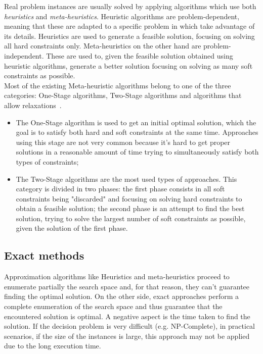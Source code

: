 Real problem instances are usually solved by applying algorithms which use both \textit{heuristics} and \textit{meta-heuristics}. Heuristic algorithms are problem-dependent, meaning that these are adapted to a specific problem in which take advantage of its details. Heuristics are used to generate a feasible solution, focusing on solving all hard constraints only. Meta-heuristics on the other hand are problem-independent. These are used to, given the feasible solution obtained using heuristic algorithms, generate a better solution focusing on solving as many soft constraints as possible.\\

Most of the existing Meta-heuristic algorithms belong to one of the three categories: One-Stage algorithms, Two-Stage algorithms and algorithms that allow relaxations~\cite{Lewis2007}. 
\begin{itemize}
  \item The One-Stage algorithm is used to get an initial optimal solution, which the goal is to satisfy both hard and soft constraints at the same time. Approaches using this stage are not very common because it's hard to get proper solutions in a reasonable amount of time trying to simultaneously satisfy both types of constraints;
  \item The Two-Stage algorithms are the most used types of approaches. This category is divided in two phases: the first phase consists in all soft constraints being "discarded" and focusing on solving hard constraints to obtain a feasible solution; the second phase is an attempt to find the best solution, trying to solve the largest number of soft constraints as possible, given the solution of the first phase.
\end{itemize}

\subsection{Exact methods}
\label{subsection:exactmethods}
Approximation algorithms like Heuristics and meta-heuristics proceed to enumerate partially the search space and, for that reason, they can't guarantee finding the optimal solution. On the other side, exact approaches perform a complete enumeration of the search space and thus guarantee that the encountered solution is optimal. A negative aspect is the time taken to find the solution. If the decision problem is very difficult (e.g. NP-Complete), in practical scenarios, if the size of the instances is large, this approach may not be applied due to the long execution time.\\

